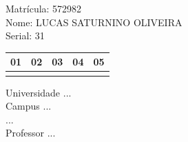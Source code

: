 \documentclass[10pt,a4paper,twocolumn]{report}
\begin{document}
Matrícula: 572982\\ Nome: LUCAS SATURNINO OLIVEIRA \\ Serial: 31\\
\begin{tabular}{|l|l|l|l|l|}\hline
01  &02  &03  &04  &05 \\ \hline 
 & & & & \\ \hline 
\end{tabular}
 \cleardoublepage 

\begin{flushleft}
Universidade ...\\
Campus ...\\
...\\
Professor ...\\
\end{flushleft}
\end{document}
